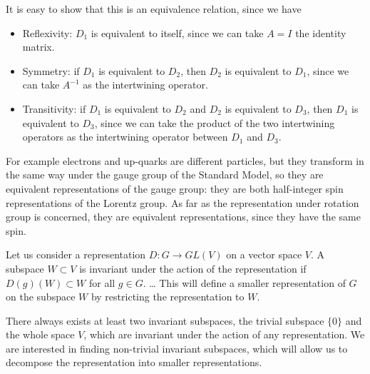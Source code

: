 It is easy to show that this is an equivalence relation, since we have
\begin{itemize}
    \item Reflexivity: \(D_1\) is equivalent to itself, since we can take \(A = I\) the identity matrix.
    \item Symmetry: if \(D_1\) is equivalent to \(D_2\), then \(D_2\) is equivalent to \(D_1\), since we can take \(A^{-1}\) as the intertwining operator.
    \item Transitivity: if \(D_1\) is equivalent to \(D_2\) and \(D_2\) is equivalent to \(D_3\), then \(D_1\) is equivalent to \(D_3\), since we can take the product of the two intertwining operators as the intertwining operator between \(D_1\) and \(D_3\).
\end{itemize}

\begin{example}
    For example electrons and up-quarks are different particles, but they transform in the same way under the gauge group of the Standard Model, so they are equivalent representations of the gauge group: they are both half-integer spin representations of the Lorentz group. As far as the representation under rotation group is concerned, they are equivalent representations, since they have the same spin.
\end{example}

\begin{definition}
    Let us consider a representation \(D : G \to GL(V)\) on a vector space \(V\). A subspace \(W \subset V\) is invariant under the action of the representation if \(D(g)(W) \subset W\) for all \(g \in G\).
    \dots
    This will define a smaller representation of \(G\) on the subspace \(W\) by restricting the representation to \(W\).
\end{definition}

There always exists at least two invariant subspaces, the trivial subspace \(\{0\}\) and the whole space \(V\), which are invariant under the action of any representation. We are interested in finding non-trivial invariant subspaces, which will allow us to decompose the representation into smaller representations.

